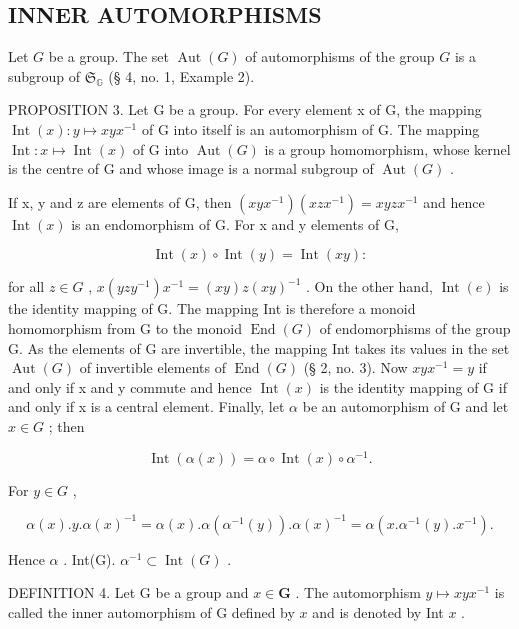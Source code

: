 \subsection{INNER AUTOMORPHISMS}

Let \(G\) be a group. The set \(\operatorname{Aut}(G)\) of automorphisms of the group \(G\) is a subgroup of \(\mathfrak{S}_{\mathbb{G}}\) (§ 4, no. 1, Example 2).

PROPOSITION 3. Let G be a group. For every element x of G, the mapping \(\operatorname{Int}(x): y \mapsto xyx^{-1}\) of G into itself is an automorphism of G. The mapping \(\operatorname{Int}: x \mapsto \operatorname{Int}(x)\) of G into \(\operatorname{Aut}(G)\) is a group homomorphism, whose kernel is the centre of G and whose image is a normal subgroup of \(\operatorname{Aut}(G)\) .

If x, y and z are elements of G, then \((xyx^{-1})(xzx^{-1}) = xyzx^{-1}\) and hence \(\operatorname{Int}(x)\) is an endomorphism of G. For x and y elements of G,

\[
\operatorname{Int} (x) \circ \operatorname{Int} (y) = \operatorname{Int} (x y):
\]

for all \(z \in G\) , \(x(yzy^{-1})x^{-1} = (xy)z(xy)^{-1}\) . On the other hand, \(\operatorname{Int}(e)\) is the identity mapping of G. The mapping Int is therefore a monoid homomorphism from G to the monoid \(\operatorname{End}(G)\) of endomorphisms of the group G. As the elements of G are invertible, the mapping Int takes its values in the set \(\operatorname{Aut}(G)\) of invertible elements of \(\operatorname{End}(G)\) (§ 2, no. 3). Now \(xyx^{-1} = y\) if and only if x and y commute and hence \(\operatorname{Int}(x)\) is the identity mapping of G if and only if x is a central element. Finally, let \(\alpha\) be an automorphism of G and let \(x \in G\) ; then

\[
\operatorname{Int} (\alpha (x)) = \alpha \circ \operatorname{Int} (x) \circ \alpha^ {- 1}.\tag{2}
\]

For \(y \in G\) ,

\[
\alpha (x). y. \alpha (x) ^ {- 1} = \alpha (x). \alpha (\alpha^ {- 1} (y)). \alpha (x) ^ {- 1} = \alpha (x. \alpha^ {- 1} (y). x ^ {- 1}).
\]

Hence \(\alpha\) . Int(G). \(\alpha^{-1} \subset \operatorname{Int}(G)\) .

DEFINITION 4. Let G be a group and \(x \in \mathbf{G}\) . The automorphism \(y \mapsto xyx^{-1}\) is called the inner automorphism of G defined by \(x\) and is denoted by Int \(x\) .

